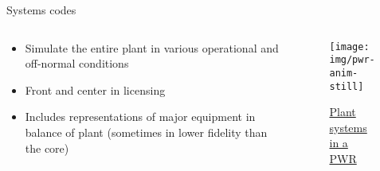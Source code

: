 \documentclass[pdf,aspectratio=169]{beamer}
\begin{document}
\begin{frame}{Systems codes}
\begin{columns}
    \begin{column}{0.5\textwidth}
    \begin{itemize}
        \item Simulate the entire plant in various operational and off-normal conditions
        \item Front and center in licensing
        \item Includes representations of major equipment in balance of plant
            (sometimes in lower fidelity than the core)
    \end{itemize}
    \end{column}
    \begin{column}{0.5\textwidth}
        \begin{figure}[ht]
        \centering
            \texttt{[image: img/pwr-anim-still]}
            \caption{\tiny 
            \href{https://commons.wikimedia.org/w/index.php?title=File\%3APWR_nuclear_power_plant_animation.webm}{Plant
            systems in a PWR}}
        \end{figure}
    \end{column}
\end{columns}
\end{frame}
\end{document}
